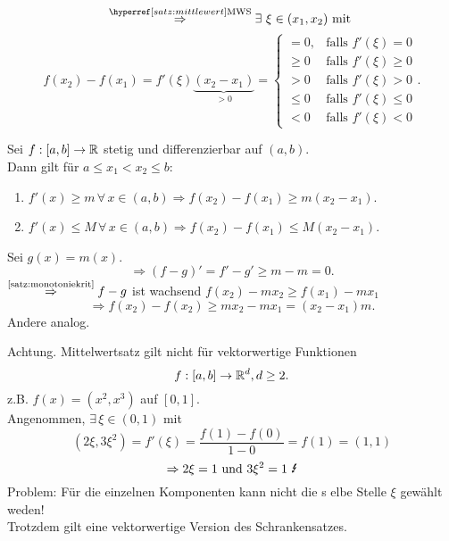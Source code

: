 \documentclass[../ana1.tex]{subfiles}
\begin{document}
\begin{bew}
    \[ \overref{satz:mittlewert}{MWS}{\Rightarrow} \exists \, 
    \xi \in (x_1, x_2) \text{ mit } \]
    \[ f(x_2) - f(x_1) = f'(\xi) \underbrace{(x_2 - x_1)}_{>0}
    = \begin{cases}
        =0, & \text{falls } f'(\xi) = 0\\
        \geq 0 &\text{falls } f'(\xi) \geq 0\\
        > 0 &\text{falls } f'(\xi) > 0\\
        \leq 0 &\text{falls } f'(\xi) \leq 0\\
        < 0 &\text{falls } f'(\xi) < 0
    \end{cases}. \]
\end{bew}
\begin{kor}[Schrankensatz]
    Sei \( f: [a,b] \rightarrow \mathbb{R} \) stetig und differenzierbar 
    auf \( (a,b) \).\\
    Dann gilt für \( a \leq x_1 < x_2 \leq b \): 
    \begin{enumerate}
        \item \( f'(x) \geq m \,\forall \, x \in (a,b) 
        \Rightarrow f(x_2) - f(x_1) \geq m(x_2 - x_1) \).
        \item \( f'(x) \leq M \, \forall \, x\in (a,b) 
        \Rightarrow f(x_2) - f(x_1) \leq M(x_2 - x_1) \).
    \end{enumerate}
\end{kor}
\begin{bew}
    Sei \( g(x) = m(x) \).
    \[ \Rightarrow (f - g)' = f' - g' \geq m - m = 0. \]
    \( \oversett{\autoref{satz:monotoniekrit}}{\Rightarrow} 
    f - g \) ist wachsend \dphp{} \( f(x_2) - m x_2 \geq 
    f(x_1) - m x_1 \) 
    \[ \Rightarrow f(x_2) - f(x_2) \geq m x_2 - m x_1 
    = (x_2 - x_1)m. \]
    Andere analog.
\end{bew}
\begin{bsp}%
    Achtung. Mittelwertsatz gilt nicht für 
    vektorwertige Funktionen
    \[ f: [a,b] \rightarrow \mathbb{R}^d, d \geq 2. \]
    z.B. \( f(x) = (x^2,x^3) \) auf \( [0,1] \). \\
    Angenommen, \( \exists \, \xi \in (0,1) \) mit 
    \[ (2\xi, 3\xi^2) = f'(\xi) = \frac{f(1) - f(0)}{1-0} 
    = f(1) = (1,1) \]
    \[ \Rightarrow 2\xi = 1 \text{ und } 3\xi^2 = 1 \text{ \Lightning{}} \]
    Problem: Für die einzelnen Komponenten kann nicht die s
    elbe Stelle \( \xi \) gewählt weden!\\
    Trotzdem gilt eine vektorwertige Version des Schrankensatzes.    
\end{bsp}
\end{document}
